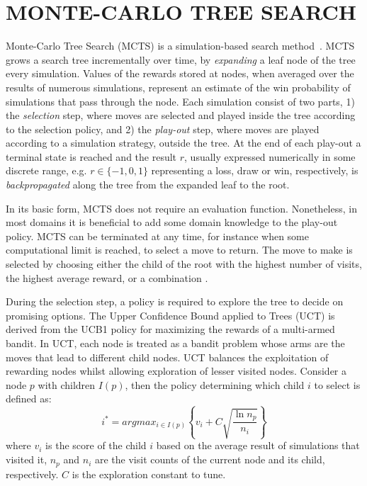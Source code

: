 \documentclass{ecai2014}
\begin{document}
\section{MONTE-CARLO TREE SEARCH}
\label{sec:mcts}

Monte-Carlo Tree Search (MCTS) is a simulation-based search method~\cite{coulom2007efficient,kocsis2006bandit}. MCTS grows a search tree incrementally over time, by \emph{expanding} a leaf node of the tree every simulation. Values of the rewards stored at nodes, when averaged over the results of numerous simulations, represent an estimate of the win probability of simulations that pass through the node. 
Each simulation consist of two parts, 1) the \emph{selection} step, where moves are selected and played inside the tree according to the selection policy, and 2) the \emph{play-out} step, where moves are played according to a simulation strategy, outside the tree. At the end of each play-out a terminal state is reached and the result $r$, usually expressed numerically in some discrete range, e.g. $r \in \{-1, 0, 1\}$ representing a loss, draw or win, respectively, is \emph{backpropagated} along the tree from the expanded leaf to the root. 

In its basic form, MCTS does not require an evaluation function. Nonetheless, in most domains it is beneficial to add some domain knowledge to the play-out policy. MCTS can be terminated at any time, for instance when some computational limit is reached, to select a move to return. The move to make is selected by choosing either the child of the root with the highest number of visits, the highest average reward, or a combination \cite{chaslot2008progressive}. 

During the selection step, a policy is required to explore the tree to decide on promising options. The Upper Confidence Bound applied to Trees (UCT) \cite{kocsis2006bandit} is derived from the UCB1 policy \cite{auer2002using} for maximizing the rewards of a multi-armed bandit. In UCT, each node is treated as a bandit problem whose arms are the moves that lead to different child nodes. UCT balances the exploitation of rewarding nodes whilst allowing exploration of lesser visited nodes. Consider a node $p$ with children $I(p)$, then the policy determining which child $i$ to select is defined as:
\begin{equation}
\label{eq:uct}
i^* = argmax_{i \in I(p)}\left\{ v_i + C \sqrt{ \frac{\ln{n_p}}{n_i}}\right\}
\end{equation}
where $v_i$ is the score of the child $i$ based on the average result of simulations that visited it, $n_p$ and $n_i$ are the visit counts of the current node and its child, respectively. $C$ is the exploration constant to tune. 
\end{document}
